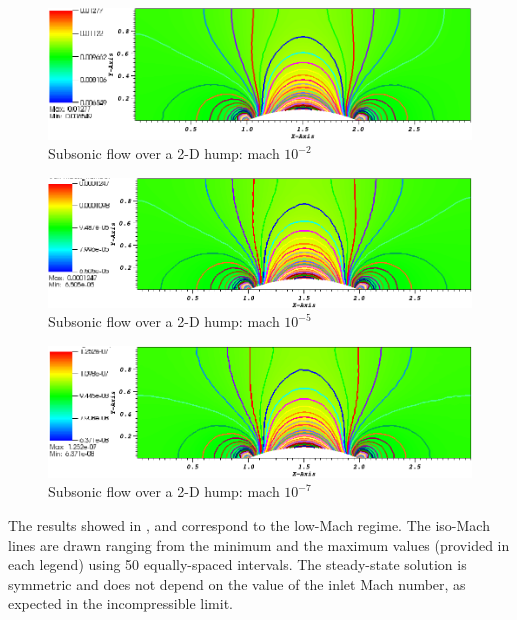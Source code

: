         \begin{figure}[H]
                \centering
                \includegraphics[width=\textwidth]{figures/Hump2D_mach_0p01.png}
                \caption{Subsonic flow over a 2-D hump: mach $10^{-2}$}
                \label{fig:2d_hump_mach_0p01}
        \end{figure}%
        
        \begin{figure}[H]
                \centering
                \includegraphics[width=\textwidth]{figures/Hump2D_mach_1em4.png}
                \caption{Subsonic flow over a 2-D hump: mach $10^{-5}$}
                \label{fig:2d_hump_mach_0p0001}
        \end{figure}

        \begin{figure}[H]
                \centering
                \includegraphics[width=\textwidth]{figures/Hump2D_mach_1em7.png}
                \caption{Subsonic flow over a 2-D hump: mach $10^{-7}$}
                \label{fig:2d_hump_mach_0p0000001}
        \end{figure}
%
The results showed in ,  and  correspond to the low-Mach regime. The iso-Mach lines are drawn ranging from the minimum and the maximum values (provided in each legend) using 50 equally-spaced intervals. The steady-state solution is symmetric and does not depend on the value of the inlet Mach number, as expected in the incompressible limit. 

